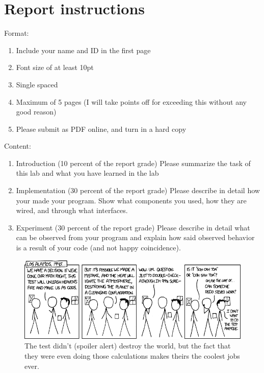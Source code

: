 \documentclass[letterpaper,12pt]{article}
\begin{document}
\section*{Report instructions}
Format:
\begin{enumerate}
   \item Include your name and ID in the first page
   \item Font size of at least 10pt
   \item Single spaced
   \item Maximum of 5 pages (I will take points off for exceeding this without any good reason)
   \item Please submit as PDF online, and turn in a hard copy
\end{enumerate}
Content:
\begin{enumerate}
   \item Introduction (10 percent of the report grade) Please summarize the task of this lab and what you have learned in the lab
   \item Implementation (30 percent of the report grade) Please describe in detail how your made your program. Show what components you used, how they are wired, and through what interfaces.
   \item Experiment (30 percent of the report grade) Please describe in detail what can be observed from your program and explain how said observed behavior is a result of your code (and not happy coincidence).
\end{enumerate}

\begin{figure}[ht!]
	\centering
	\includegraphics[width=5in]{los_alamos.png}
   \caption*{The test didn't (spoiler alert) destroy the world, but the fact that they were even doing those calculations makes theirs the coolest jobs ever.}
\end{figure}
\end{document}
